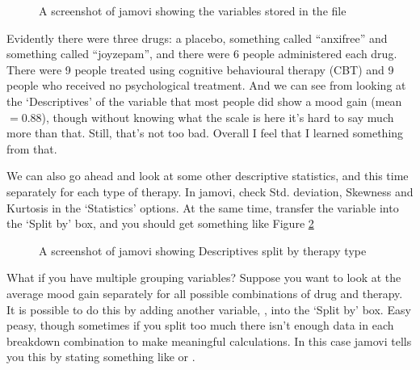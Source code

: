 \vspace{0.5cm}
\begin{figure}[ht]
\begin{center}
\caption{A screenshot of jamovi showing the variables stored in the  file}
\label{fig:clinicaltrial}
\HR
\end{center}
\end{figure}

Evidently there were three drugs: a placebo, something called ``anxifree'' and something called ``joyzepam'', and there were 6 people administered each drug. There were 9 people treated using cognitive behavioural therapy (CBT) and 9 people who received no psychological treatment. And we can see from looking at the `Descriptives' of the  variable that most people did show a mood gain (mean $=0.88$), though without knowing what the scale is here it's hard to say much more than that. Still, that's not too bad. Overall I feel that I learned something from that.

We can also go ahead and look at some other descriptive statistics, and this time separately for each type of therapy. In jamovi, check Std. deviation, Skewness and Kurtosis in the `Statistics' options. At the same time, transfer the  variable into the `Split by' box, and you should get something like Figure \ref{fig:clinicaltrial_grouping}

\vspace{0.5cm}
\begin{figure}[htb]
\begin{center}
\caption{A screenshot of jamovi showing Descriptives split by therapy type}
\label{fig:clinicaltrial_grouping}
\HR
\end{center}
\end{figure}

What if you have multiple grouping variables? Suppose you want to look at the average mood gain separately for all possible combinations of drug and therapy. It is possible to do this by adding another variable, , into the `Split by' box. Easy peasy, though sometimes if you split too much there isn't enough data in each breakdown combination to make meaningful calculations. In this case jamovi tells you this by stating something like  or .


